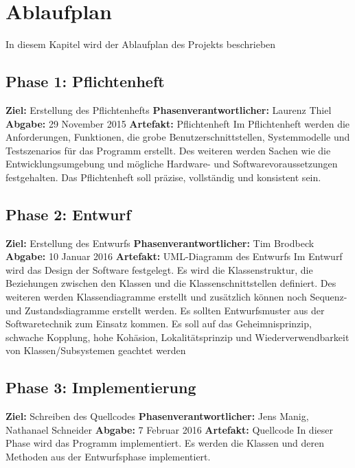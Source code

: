 \section{Ablaufplan}
In diesem Kapitel wird der Ablaufplan des Projekts beschrieben
\subsection{Phase 1: Pflichtenheft}
\textbf{Ziel:} Erstellung des Pflichtenhefts \newline
\textbf{Phasenverantwortlicher:} Laurenz Thiel \newline
\textbf{Abgabe:} 29 November 2015 \newline
\textbf{Artefakt:} Pflichtenheft \newline
Im Pflichtenheft werden die Anforderungen, Funktionen, die grobe Benutzerschnittstellen, Systemmodelle und Testszenarios für das Programm erstellt. Des weiteren werden Sachen wie die Entwicklungsumgebung und mögliche Hardware- und Softwarevoraussetzungen festgehalten. Das Pflichtenheft soll präzise, vollständig und konsistent sein.

\subsection{Phase 2: Entwurf}
\textbf{Ziel:} Erstellung des Entwurfs \newline
\textbf{Phasenverantwortlicher:} Tim Brodbeck \newline
\textbf{Abgabe:} 10 Januar 2016 \newline
\textbf{Artefakt:} UML-Diagramm des Entwurfs \newline
Im Entwurf wird das Design der Software festgelegt. Es wird die Klassenstruktur, die Beziehungen zwischen den Klassen und die Klassenschnittstellen definiert. Des weiteren werden Klassendiagramme erstellt und zusätzlich können noch Sequenz- und Zustandsdiagramme erstellt werden. Es sollten Entwurfsmuster aus der Softwaretechnik zum Einsatz kommen. Es soll auf das Geheimnisprinzip, schwache Kopplung, hohe Kohäsion, Lokalitätsprinzip und Wiederverwendbarkeit von Klassen/Subsystemen geachtet werden

\subsection{Phase 3: Implementierung}
\textbf{Ziel:} Schreiben des Quellcodes \newline
\textbf{Phasenverantwortlicher:} Jens Manig, Nathanael Schneider  \newline
\textbf{Abgabe:} 7 Februar 2016 \newline
\textbf{Artefakt:} Quellcode \newline
In dieser Phase wird das Programm implementiert. Es werden die Klassen und deren Methoden aus der Entwurfsphase implementiert.

